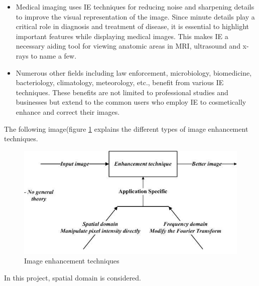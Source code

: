 \begin{itemize}
	\item Medical imaging uses IE techniques for reducing noise and sharpening details to improve the visual representation of the image. Since minute details play a critical role in diagnosis and treatment of disease, it is essential to highlight important features while displaying medical images. This makes IE a necessary aiding tool for viewing anatomic areas in MRI, ultrasound and x-rays to name a few.
	\item Numerous other fields including law enforcement, microbiology, biomedicine, bacteriology, climatology, meteorology, etc., benefit from various IE techniques. These benefits are not limited to professional studies and businesses but extend to the common users who employ IE to cosmetically enhance and correct their images.
	
\end{itemize}

The following image(figure \ref{fig:imageEnhancementTechniques} explains the different types of image enhancement techniques.

\begin{figure}
	\centering
	\includegraphics[scale=0.7]{images/ch2/imageEnhancementTechniques.jpg}
	\caption{Image enhancement techniques}
	\label{fig:imageEnhancementTechniques}
\end{figure}

In this project, spatial domain is considered.



%

